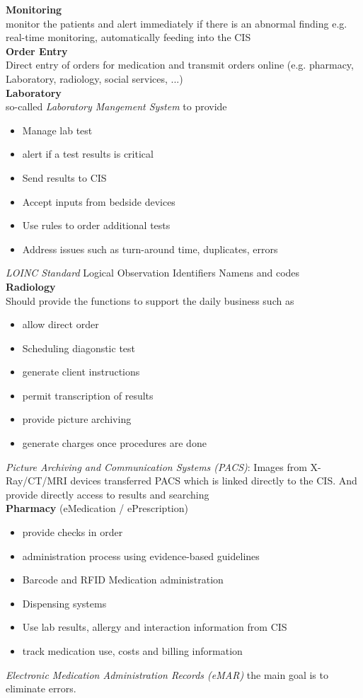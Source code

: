 \documentclass{report}
\theoremstyle{definition}
\theoremstyle{example}
\begin{document}
\textbf{Monitoring}\\
monitor the patients and alert immediately if there is an abnormal finding e.g. real-time monitoring, automatically feeding into the CIS\\

\textbf{Order Entry}\\
Direct entry of orders for medication and transmit orders online (e.g. pharmacy, Laboratory, radiology, social services, ...)\\

\textbf{Laboratory}\\
so-called \textit{Laboratory Mangement System} to provide
\begin{itemize}
   \item Manage lab test
   \item alert if a test results is critical
   \item Send results to CIS
   \item Accept inputs from bedside devices
   \item Use rules to order additional tests
   \item Address issues such as turn-around time, duplicates, errors
\end{itemize}
\textit{LOINC Standard} Logical Observation Identifiers Namens and codes\\

\textbf{Radiology}\\
Should provide the functions to support the daily business such as
\begin{itemize}
   \item allow direct order
   \item Scheduling diagonstic test
   \item generate client instructions
   \item permit transcription of results
   \item provide picture archiving
   \item generate charges once procedures are done
\end{itemize}
\textit{Picture Archiving and Communication Systems (PACS)}: Images from X-Ray/CT/MRI devices transferred PACS which is linked directly to the CIS. And provide directly access to results and searching\\

\textbf{Pharmacy} (eMedication / ePrescription)\\
\begin{itemize}
   \item provide checks in order
   \item administration process using evidence-based guidelines
   \item Barcode and RFID Medication administration
   \item Dispensing systems
   \item Use lab results, allergy and interaction information from CIS
   \item track medication use, costs and billing information
\end{itemize}
\textit{Electronic Medication Administration Records (eMAR)} the main goal is to eliminate errors.
\end{document}
